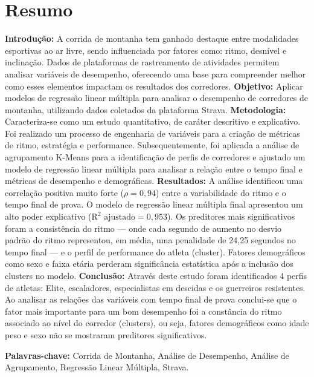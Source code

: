 \chapter*{Resumo}
\thispagestyle{empty}
\label{chap:resumo}

\textbf{Introdução:} A corrida de montanha tem ganhado destaque entre modalidades esportivas ao ar livre, sendo influenciada por fatores como: ritmo, desnível e inclinação. Dados de plataformas de rastreamento de atividades permitem analisar variáveis de desempenho, oferecendo uma base para compreender melhor como esses elementos impactam os resultados dos corredores.
\textbf{Objetivo:} Aplicar modelos de regressão linear múltipla para analisar o desempenho de corredores de montanha, utilizando dados coletados da plataforma Strava.
\textbf{Metodologia:} Caracteriza-se como um estudo quantitativo, de caráter descritivo e explicativo. Foi realizado um processo de engenharia de variáveis para a criação de métricas de ritmo, estratégia e performance. Subsequentemente, foi aplicada a análise de agrupamento K-Means para a identificação de perfis de corredores e ajustado um modelo de regressão linear múltipla para analisar a relação entre o tempo final e métricas de desempenho e demográficas.
\textbf{Resultados:} A análise identificou uma correlação positiva muito forte ($\rho = 0,94$) entre a variabilidade do ritmo e o tempo final de prova. O modelo de regressão linear múltipla final apresentou um alto poder explicativo ($\text{R}^2 \text{ ajustado} = 0,953$). Os preditores mais significativos foram a consistência do ritmo — onde cada segundo de aumento no desvio padrão do ritmo representou, em média, uma penalidade de 24,25 segundos no tempo final — e o perfil de performance do atleta (cluster). Fatores demográficos como sexo e faixa etária perderam significância estatística após a inclusão dos clusters no modelo.
\textbf{Conclusão:} Através deste estudo foram identificados 4 perfis de atletas: Elite, escaladores, especialistas em descidas e os guerreiros resistentes. Ao analisar as relações das variáveis com tempo final de prova conclui-se que o fator mais importante para um bom desempenho foi a constância do ritmo associado ao nível do corredor (clusters), ou seja, fatores demográficos como idade peso e sexo não se mostraram preditores significativos.

\vspace{0.5\baselineskip}
\textbf{Palavras-chave:} Corrida de Montanha, Análise de Desempenho, Análise de Agrupamento, Regressão Linear Múltipla, Strava.